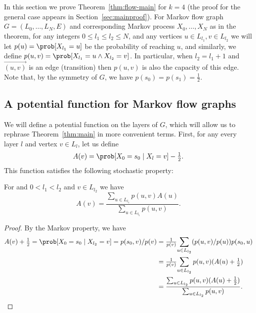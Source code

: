In this section we prove Theorem~\ref{thm:flow-main} for $k=4$ (the proof for the general case appears in Section~\ref{sec:mainproof}). For Markov flow graph $G=(L_0,\ldots,L_N,E)$ and corresponding Markov process $X_0,\ldots,X_N$ as in the theorem, for any integers $0\leq l_1\leq l_2\leq N$, and any vertices $u\in L_{l_1},v\in L_{l_2}$ we will let $p(u)=\prob[X_{l_1}=u]$ be the probability of reaching $u$, and similarly, we define $p(u,v)=\prob[X_{l_1}=u\wedge X_{l_2}=v]$. In particular, when $l_2=l_1+1$ and $\overrightarrow{(u,v)}$ is an edge (transition) then $p(u,v)$ is also the capacity of this edge. Note that, by the symmetry of $G$, we have $p(s_0)=p(s_1)=\frac12$.

\subsection{A potential function for Markov flow graphs}

\iffalse
In this section$G=(L_0,\ldots,L_N,E)$ is a symmetric Markov flow graph, representing a Markov process $X_0,\ldots,X_N$ with $L_0=\{s_0,s_1\}$ and $L_N=\{t_0,t_1\}$, and $L_l=\{v^l_i\}$ for $l=1,\ldots,t-1$. Each layer has at most $k$ vertices. Each vertex $v$ has probability $p(v)$ of being reached in the Markov flow starting from $p(s_0)=p(s_1)=\frac12$, and each transition $\overrightarrow{(u,v)}$ has probability $p(u,v)$ of being traversed (i.e.\ capacity). We extend this notation and write, for any vertices $u\in L_{l_1}, v\in L_{l_2}$, where $l_1<l_2$, $p(u,v)=\prob[X_{l_1}=u\wedge X_{l_2}=v]$.
\fi

We will define  a potential function on the layers of $G$, which will allow us to rephrase Theorem~\ref{thm:main} in more convenient terms. First, for any every layer $l$ and vertex $v\in L_l$, let us define $$A(v)=\prob[X_0=s_0\mid X_l=v]-\textstyle\frac12.$$
This function satisfies the following stochastic property:

\begin{lemma}\label{lem:A-stochastic} For and $0<l_1<l_2$ and $v\in L_{l_2}$ we have $$A(v)=\frac{\sum_{u\in L_{l_1}}p(u,v)A(u)}{\sum_{u\in L_{l_1}}p(u,v)}.$$
\end{lemma}
\ifprocs\else
\begin{proof} By the Markov property, we have
\begin{align*}
A(v)+{\textstyle\frac12}=\prob[X_0=s_0\mid X_{l_2}=v]=p(s_0,v)/p(v)&={\textstyle\frac1{p(v)}}{\sum_{u\in L_{l_2}}(p(u,v)/p(u))p(s_0,u)}\\
&={\textstyle\frac1{p(v)}}{\sum_{u\in L_{l_2}}p(u,v)(A(u)+{\textstyle\frac12})}\\
&=\frac{\sum_{u\in L_{l_2}}p(u,v)(A(u)+{\textstyle\frac12})}{\sum_{u\in L_{l_2}}p(u,v)}.
\end{align*}
\end{proof}
\fi

